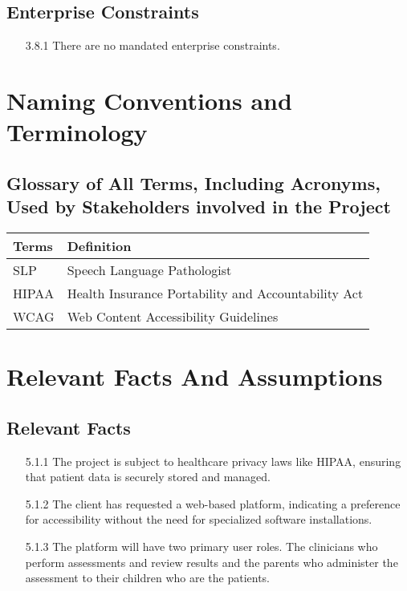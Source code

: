 \documentclass[12pt]{article}
\begin{document}
\subsection{Enterprise Constraints}
\begin{itemize}
  \item[3.8.1] \color{red} There are no mandated enterprise constraints. \color{black}
\end{itemize}

\section{Naming Conventions and Terminology}
\subsection{Glossary of All Terms, Including Acronyms, Used by Stakeholders
involved in the Project}

\begin{tabularx}{\textwidth}{p{2cm}X}
  \toprule {\textbf{Terms}} & {\textbf{Definition}}\\
  \midrule
  SLP & Speech Language Pathologist\\
  HIPAA & Health Insurance Portability and Accountability Act\\
  WCAG & Web Content Accessibility Guidelines\\
  \bottomrule
\end{tabularx}

\section{Relevant Facts And Assumptions}
\subsection{Relevant Facts}
\begin{itemize}
  \item[5.1.1] The project is subject to healthcare privacy laws like HIPAA, ensuring that patient data is securely stored and managed.
  \item[5.1.2] The client has requested a web-based platform, indicating a preference for accessibility without the need for specialized 
  software installations.
  \item[5.1.3] The platform will have two primary user roles. The clinicians who perform assessments and review results and the parents who 
  administer the assessment to their children who are the patients.
\end{itemize}
\end{document}
